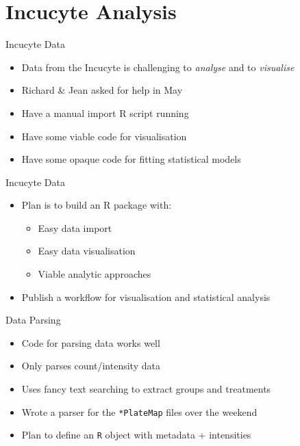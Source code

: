 \documentclass[11pt]{beamer}
\begin{document}
\section{Incucyte Analysis}

\begin{frame}{Incucyte Data}

	\begin{itemize}
		\item Data from the Incucyte is challenging to \textit{analyse} and to \textit{visualise}
		\item Richard \& Jean asked for help in May
		\item Have a manual import R script running
		\item Have some viable code for visualisation
		\item Have some opaque code for fitting statistical models
	\end{itemize}

\end{frame}

\begin{frame}{Incucyte Data}

	\begin{itemize}
		\item Plan is to build an R package with:
		\begin{itemize}
			\item Easy data import
			\item Easy data visualisation
			\item Viable analytic approaches
		\end{itemize}
		\item Publish a workflow for visualisation and statistical analysis
	\end{itemize}

\end{frame}


\begin{frame}{Data Parsing}

	\begin{itemize}
		\item Code for parsing data works well
		\item Only parses count/intensity data
		\item Uses fancy text searching to extract groups and treatments
		\item Wrote a parser for the \texttt{*PlateMap} files over the weekend
		\item Plan to define an \texttt{R} object with metadata + intensities
	\end{itemize}

\end{frame}
\end{document}
